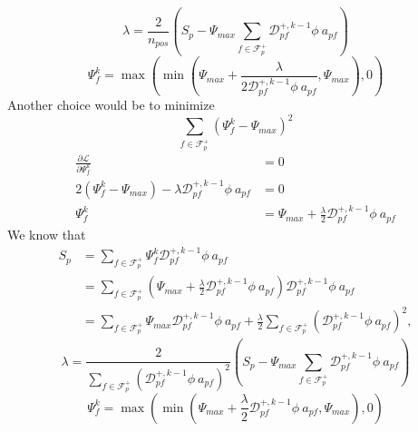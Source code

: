 \documentclass[../thesis.tex]{subfiles}
\begin{document}
\begin{equation}
	\lambda = \frac{2}{n_{pos}}\left( S_p - \Psi_{max} \sum_{f \in \mathcal{F}_p^+}
	\mathcal{D}^{+,k-1}_{pf}\phi\ a_{pf} \right)
\end{equation}
\begin{equation}
	\Psi_{f}^{k} =
	\max
	\left( \min
	\left( \Psi_{max} + \frac{\lambda}{2 \mathcal{D}^{+,k-1}_{pf}\phi\ a_{pf}}, \Psi_{max} \right), 0 \right)
\end{equation}
Another choice would be to minimize
\begin{equation*}
	\sum_{f \in \mathcal{F}_p^+}
	\left( \Psi_{f}^{k} - \Psi_{max} \right)^2
\end{equation*}
\begin{equation*}
	\begin{split}
		\frac{\partial \mathcal{L}}{\partial \Psi_f^k}
		&= 0
		\\
		2\left( \Psi_{f}^{k} - \Psi_{max} \right)
		-
		\lambda \mathcal{D}^{+,k-1}_{pf}\phi\ a_{pf}
		&= 0
		\\
		\Psi_{f}^{k}
		&= \Psi_{max} + \frac{\lambda}{2}\mathcal{D}^{+,k-1}_{pf}\phi\ a_{pf}
	\end{split}
\end{equation*}
We know that
\begin{equation}
	\begin{split}
		S_p &=
		\sum_{f \in \mathcal{F}_p^+}
		\Psi_{f}^{k} \mathcal{D}^{+,k-1}_{pf}\phi\ a_{pf}
		\\
		&= \sum_{f \in \mathcal{F}_p^+}
		\left( \Psi_{max} + \frac{\lambda}{2}\mathcal{D}^{+,k-1}_{pf}\phi\ a_{pf}\right) \mathcal{D}^{+,k-1}_{pf}\phi\ a_{pf}
		\\
		&= \sum_{f \in \mathcal{F}_p^+}
		\Psi_{max} \mathcal{D}^{+,k-1}_{pf}\phi\ a_{pf}
		+ \frac{\lambda}{2}
		\sum_{f \in \mathcal{F}_p^+}
		\left( \mathcal{D}^{+,k-1}_{pf}\phi\ a_{pf} \right)^2,
	\end{split}
\end{equation}
\begin{equation}
	\lambda = \frac{2}{\sum_{f \in \mathcal{F}_p^+}
	\left( \mathcal{D}^{+,k-1}_{pf}\phi\ a_{pf} \right)^2}\left( S_p - \Psi_{max} \sum_{f \in \mathcal{F}_p^+}
	\mathcal{D}^{+,k-1}_{pf}\phi\ a_{pf} \right)
\end{equation}
\begin{equation}
	\Psi_{f}^{k} =
	\max
	\left( \min
	\left( \Psi_{max} + \frac{\lambda}{2}\mathcal{D}^{+,k-1}_{pf}\phi\ a_{pf}, \Psi_{max} \right), 0 \right)
\end{equation}
\end{document}

